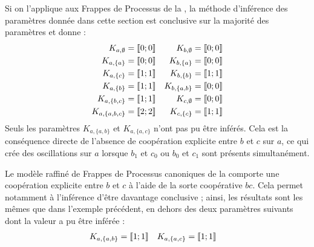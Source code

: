 \begin{example}
  Si on l'applique aux Frappes de Processus de la ,
  la méthode d'inférence des paramètres donnée dans cette section est conclusive sur la majorité
  des paramètres et donne :
  \begin{align*}
    K_{a, \emptyset} &= \mathopen{\llbracket}0\mathclose{};0\mathclose{\rrbracket} &
    K_{b, \emptyset} &= \mathopen{\llbracket}0\mathclose{};0\mathclose{\rrbracket} \\
    K_{a, \{a\}} &= \mathopen{\llbracket}0\mathclose{};0\mathclose{\rrbracket} &
    K_{b, \{a\}} &= \mathopen{\llbracket}0\mathclose{};0\mathclose{\rrbracket} \\
    K_{a, \{c\}} &= \mathopen{\llbracket}1\mathclose{};1\mathclose{\rrbracket} &
    K_{b, \{b\}} &= \mathopen{\llbracket}1\mathclose{};1\mathclose{\rrbracket} \\
    K_{a, \{b\}} &= \mathopen{\llbracket}1\mathclose{};1\mathclose{\rrbracket} &
    K_{b, \{a,b\}} &= \mathopen{\llbracket}0\mathclose{};0\mathclose{\rrbracket} \\
    K_{a, \{b,c\}} &= \mathopen{\llbracket}1\mathclose{};1\mathclose{\rrbracket} &
    K_{c, \emptyset} &= \mathopen{\llbracket}0\mathclose{};0\mathclose{\rrbracket} \\
    K_{a, \{a,b,c\}} &= \mathopen{\llbracket}2\mathclose{};2\mathclose{\rrbracket} &
    K_{c, \{c\}} &= \mathopen{\llbracket}1\mathclose{};1\mathclose{\rrbracket} \\
  \end{align*}
  Seuls les paramètres $K_{a,\{a,b\}}$ et $K_{a,\{a,c\}}$ n'ont pas pu être inférés.
  Cela est la conséquence directe de l'absence de coopération explicite entre $b$ et $c$ sur $a$,
  ce qui crée des oscillations sur $a$ lorsque $b_1$ et $c_0$ ou $b_0$ et $c_1$
  sont présents simultanément.
\end{example}

\begin{example}
  Le modèle raffiné de Frappes de Processus canoniques de la 
  comporte une coopération explicite entre $b$ et $c$ à l'aide de la sorte coopérative $bc$.
  Cela permet notamment à l'inférence d'être davantage conclusive ;
  ainsi, les résultats sont les mêmes que dans l'exemple précédent,
  en dehors des deux paramètres suivants dont la valeur a pu être inférée :
  \begin{align*}
    K_{a,\{a,b\}} &= \mathopen{\llbracket}1\mathclose{};1\mathclose{\rrbracket} &
    K_{a,\{a,c\}} &= \mathopen{\llbracket}1\mathclose{};1\mathclose{\rrbracket}
  \end{align*}
\end{example}



\myskip

